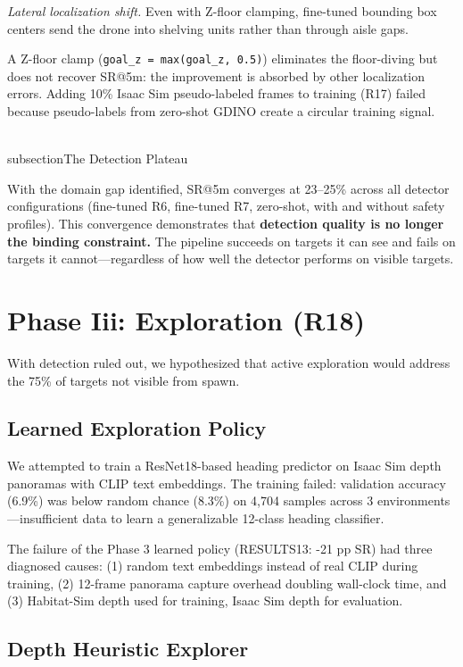 \documentclass[conference]{IEEEtran}
\begin{document}
\emph{Lateral localization shift.} Even with Z-floor clamping,
fine-tuned bounding box centers send the drone into shelving units
rather than through aisle gaps.

A Z-floor clamp (\texttt{goal\_z\ =\ max(goal\_z,\ 0.5)}) eliminates the
floor-diving but does not recover SR@5m: the improvement is absorbed by
other localization errors. Adding 10\% Isaac Sim pseudo-labeled frames
to training (R17) failed because pseudo-labels from zero-shot GDINO
create a circular training signal.

\\subsection{The Detection Plateau}\label{e.-the-detection-plateau}

With the domain gap identified, SR@5m converges at 23--25\% across all
detector configurations (fine-tuned R6, fine-tuned R7, zero-shot, with
and without safety profiles). This convergence demonstrates that
\textbf{detection quality is no longer the binding constraint.} The
pipeline succeeds on targets it can see and fails on targets it
cannot---regardless of how well the detector performs on visible
targets.

\section{Phase Iii: Exploration (R18)}\label{vi.-phase-iii-exploration-r18}

With detection ruled out, we hypothesized that active exploration would
address the 75\% of targets not visible from spawn.

\subsection{Learned Exploration Policy}\label{a.-learned-exploration-policy}

We attempted to train a ResNet18-based heading predictor on Isaac Sim
depth panoramas with CLIP text embeddings. The training failed:
validation accuracy (6.9\%) was below random chance (8.3\%) on 4,704
samples across 3 environments---insufficient data to learn a
generalizable 12-class heading classifier.

The failure of the Phase 3 learned policy (RESULTS13: -21 pp SR) had
three diagnosed causes: (1) random text embeddings instead of real CLIP
during training, (2) 12-frame panorama capture overhead doubling
wall-clock time, and (3) Habitat-Sim depth used for training, Isaac Sim
depth for evaluation.

\subsection{Depth Heuristic Explorer}\label{b.-depth-heuristic-explorer}
\end{document}
